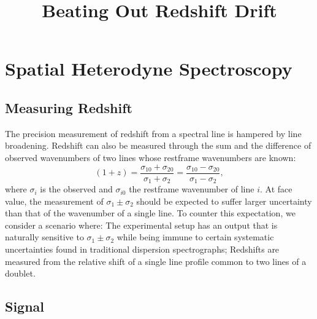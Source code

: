 \documentclass[preprint]{aastex}
\begin{document}
\title{Beating Out Redshift Drift}
\section{Spatial Heterodyne Spectroscopy}
\label{SHS:sec}
\subsection{Measuring Redshift}
The precision measurement of redshift from a spectral line is hampered by line broadening. 
Redshift can also be measured through the sum and the difference of observed wavenumbers of two lines whose restframe wavenumbers are known:
\begin{equation}
(1+z)=\frac{\sigma_{10}+\sigma_{20}}{\sigma_{1}+\sigma_{2}}=\frac{\sigma_{10}-\sigma_{20}}{\sigma_{1}-\sigma_{2}},
\label{redshift:eqn}
\end{equation}
where $\sigma_i$ is the observed and $\sigma_{i0}$ the restframe wavenumber of line $i$.
At face value, the measurement of $\sigma_1\pm\sigma_2$ should be expected to suffer larger uncertainty than that of the wavenumber
of a single line.  To counter this expectation, we consider a scenario where: The experimental setup has an output that is naturally sensitive
to $\sigma_1\pm\sigma_2$ while being immune to certain systematic uncertainties found in traditional dispersion spectrographs;
Redshifts are measured from the relative shift of a single line profile common to two lines of a doublet.


\subsection{Signal}
\end{document}
